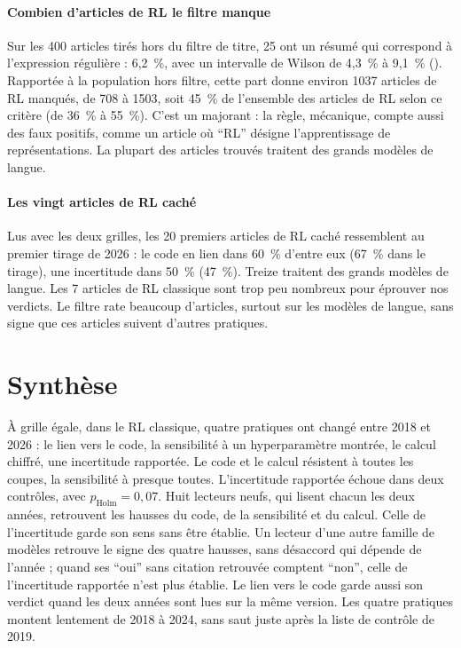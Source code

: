 \paragraph{Combien d'articles de RL le filtre manque}
Sur les 400 articles tirés hors du filtre de titre, 25 ont un résumé qui correspond à l'expression
régulière : 6,2~\%, avec un intervalle de Wilson de 4,3~\% à 9,1~\% ().
Rapportée à la population hors filtre, cette part donne environ \num{1037} articles de RL manqués, de
708 à \num{1503}, soit 45~\% de l'ensemble des articles de RL selon ce critère (de 36~\% à 55~\%). C'est
un majorant : la règle, mécanique, compte aussi des faux positifs, comme un article où \enquote{RL}
désigne l'apprentissage de représentations. La plupart des articles trouvés traitent des grands
modèles de langue.

\paragraph{Les vingt articles de RL caché}
Lus avec les deux grilles, les 20 premiers articles de RL caché ressemblent au premier tirage de 2026 :
le code en lien dans 60~\% d'entre eux (67~\% dans le tirage), une incertitude dans 50~\% (47~\%).
Treize traitent des grands modèles de langue. Les 7 articles de RL classique sont trop peu nombreux pour
éprouver nos verdicts. Le filtre rate beaucoup d'articles, surtout sur les modèles de langue, sans signe
que ces articles suivent d'autres pratiques.

\section{Synthèse}\label{sec:sr-synthese}

À grille égale, dans le RL classique, quatre pratiques ont changé entre 2018 et 2026 : le lien vers le
code, la sensibilité à un hyperparamètre montrée, le calcul chiffré, une incertitude rapportée. Le code
et le calcul résistent à toutes les coupes, la sensibilité à presque toutes. L'incertitude rapportée
échoue dans deux contrôles, avec $p_{\text{Holm}} = 0{,}07$. Huit lecteurs neufs, qui lisent chacun les
deux années, retrouvent les hausses du code, de la sensibilité et du calcul. Celle de l'incertitude
garde son sens sans être établie. Un lecteur d'une autre famille de modèles retrouve le signe des
quatre hausses, sans désaccord qui dépende de l'année ; quand ses \enquote{oui} sans citation
retrouvée comptent \enquote{non}, celle de l'incertitude rapportée n'est plus établie. Le lien vers le
code garde aussi son verdict quand les deux années
sont lues sur la même version. Les quatre pratiques montent lentement de 2018 à 2024, sans saut juste
après la liste de contrôle de 2019.

